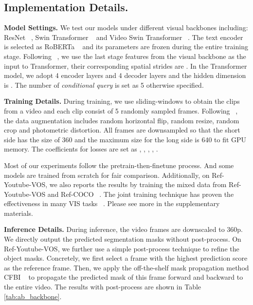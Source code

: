 \documentclass[10pt,twocolumn,letterpaper]{article}
\newcommand{\myparagraph}[1]{{\vspace{.5em} \noindent \bf #1}}
\begin{document}
{\subsection{Implementation Details.}

\myparagraph{Model Settings.} We test our models under different visual backbones including: ResNet ~\cite{he2016resnet}, Swin Transformer ~\cite{liu2021swin} and Video Swin Transformer ~\cite{liu2021videoswin}. The text encoder is selected as RoBERTa ~\cite{liu2019roberta} and its parameters are frozen during the entire training stage. Following ~\cite{zhu2020deformable}, we use the last stage features from the visual backbone as the input to Transformer, their corresponding spatial strides are . In the Transformer model, we adopt 4 encoder layers and 4 decoder layers and the hidden dimension is . The number of \textit{conditional query} is set as 5 otherwise specified.




\myparagraph{Training Details.} During training, we use sliding-windows to obtain the clips from a video and each clip consist of 5 randomly sampled frames. Following ~\cite{wang2021vistr}, the data augmentation includes random horizontal flip, random resize, random crop and photometric distortion. All frames are downsampled so that the short side has the size of 360 and the maximum size for the long side is 640 to fit GPU memory. The coefficients for losses are set as , , , , .

Most of our experiments follow the pretrain-then-finetune process. And some models are trained from scratch for fair comparison. Additionally, on Ref-Youtube-VOS, we also reports the results by training the mixed data from Ref-Youtube-VOS and Ref-COCO ~\cite{yu2016refcoco}. The joint training technique has proven the effectiveness in many VIS tasks ~\cite{athar2020stem-seg, lin2021propose-reduce, wu2021seqformer}. Please see more in the supplementary materials.





\myparagraph{Inference Details.} During inference, the video frames are downscaled to 360p. We directly output the predicted segmentation masks without post-process. On Ref-Youtube-VOS, we further use a simple post-process technique to refine the object masks. Concretely, we first select a frame with the highest prediction score as the reference frame. Then, we apply the off-the-shelf mask propagation method CFBI ~\cite{yang2020cfbi} to propagate the predicted mask of this frame forward and backward to the entire video. The results with post-process are shown in Table \ref{tab:ab_backbone}.

}
\end{document}

